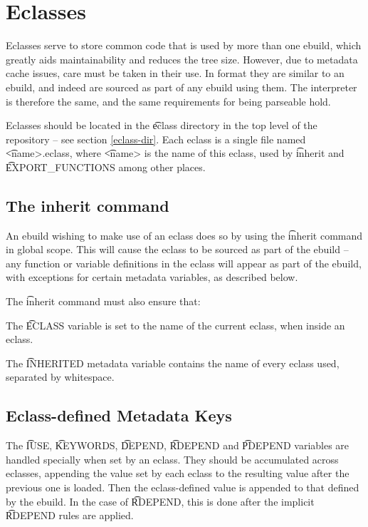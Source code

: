 \chapter{Eclasses}
\label{eclasses}

Eclasses serve to store common code that is used by more than one ebuild, which greatly aids
maintainability and reduces the tree size. However, due to metadata cache issues, care must be taken
in their use. In format they are similar to an ebuild, and indeed are sourced as part of any ebuild
using them. The interpreter is therefore the same, and the same requirements for being parseable
hold.

Eclasses should be located in the \t{eclass} directory in the top level of the repository -- see
section \ref{eclass-dir}. Each eclass is a single file named \t{<name>.eclass}, where \t{<name>} is
the name of this eclass, used by \t{inherit} and \t{EXPORT\_FUNCTIONS} among other places.

\section{The inherit command}

An ebuild wishing to make use of an eclass does so by using the \t{inherit} command in global scope.
This will cause the eclass to be sourced as part of the ebuild -- any function or variable
definitions in the eclass will appear as part of the ebuild, with exceptions for certain metadata
variables, as described below.

The \t{inherit} command must also ensure that:

\begin{bulletlist}
\item The \t{ECLASS} variable is set to the name of the current eclass, when inside an eclass.
\item The \t{INHERITED} metadata variable contains the name of every eclass used, separated
    by whitespace.
\end{bulletlist}

\section{Eclass-defined Metadata Keys}

The \t{IUSE}, \t{KEYWORDS}, \t{DEPEND}, \t{RDEPEND} and \t{PDEPEND} variables are handled specially
when set by an eclass. They should be accumulated across eclasses, appending the value set by each
eclass to the resulting value after the previous one is loaded. Then the eclass-defined value is
appended to that defined by the ebuild. In the case of \t{RDEPEND}, this is done after the
implicit \t{RDEPEND} rules are applied.


